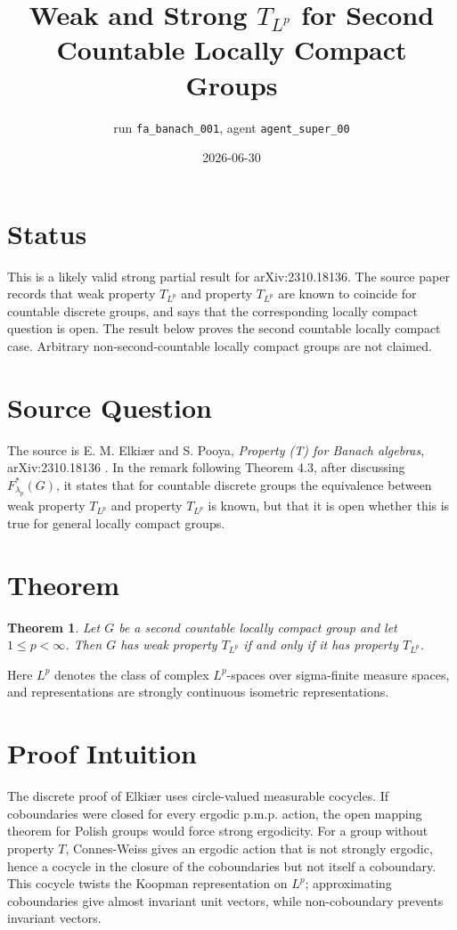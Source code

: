 \documentclass[11pt]{article}
\title{Weak and Strong \(T_{L^p}\) for Second Countable Locally Compact Groups}
\author{run \texttt{fa\_banach\_001}, agent \texttt{agent\_super\_00}}
\date{2026-06-30}
\newtheorem{theorem}{Theorem}
\theoremstyle{definition}
\begin{document}
\maketitle

\section*{Status}

This is a likely valid strong partial result for arXiv:2310.18136.  The
source paper records that weak property \(T_{L^p}\) and property \(T_{L^p}\)
are known to coincide for countable discrete groups, and says that the
corresponding locally compact question is open.  The result below proves the
second countable locally compact case.  Arbitrary non-second-countable locally
compact groups are not claimed.

\section*{Source Question}

The source is E. M. Elki\ae r and S. Pooya, \emph{Property (T) for Banach
algebras}, arXiv:2310.18136 \cite{ElkiaerPooya}.  In the remark following
Theorem 4.3, after discussing \(F^*_{\lambda_p}(G)\), it states that for
countable discrete groups the equivalence between weak property
\(T_{L^p}\) and property \(T_{L^p}\) is known, but that it is open whether
this is true for general locally compact groups.

\section*{Theorem}

\begin{theorem}\label{thm:main}
Let \(G\) be a second countable locally compact group and let
\(1\le p<\infty\).  Then \(G\) has weak property \(T_{L^p}\) if and only if
it has property \(T_{L^p}\).
\end{theorem}

Here \(L^p\) denotes the class of complex \(L^p\)-spaces over sigma-finite
measure spaces, and representations are strongly continuous isometric
representations.

\section*{Proof Intuition}

The discrete proof of Elki\ae r \cite{ElkiaerWeak} uses circle-valued
measurable cocycles.  If coboundaries were closed for every ergodic p.m.p.
action, the open mapping theorem for Polish groups would force strong
ergodicity.  For a group without property \(T\), Connes-Weiss gives an
ergodic action that is not strongly ergodic, hence a cocycle in the closure of
the coboundaries but not itself a coboundary.  This cocycle twists the
Koopman representation on \(L^p\); approximating coboundaries give almost
invariant unit vectors, while non-coboundary prevents invariant vectors.
\end{document}
